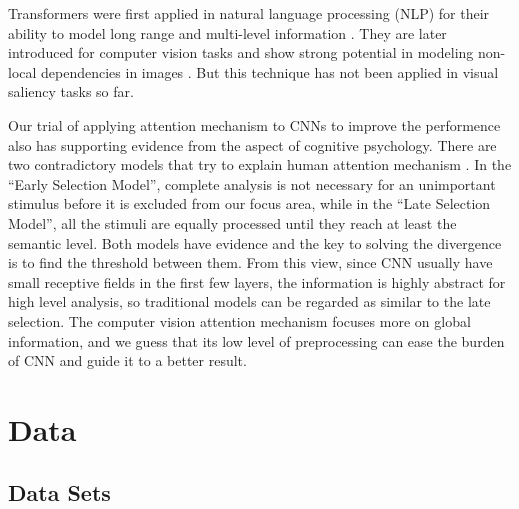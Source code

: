 \documentclass[12pt]{article}
\begin{document}
Transformers were first applied in natural language processing (NLP) for their ability to model long range and multi-level information \cite{bahdanauNeuralMachineTranslation2016a, vaswaniAttentionAllYou2017a}.
They are later introduced for computer vision tasks and show strong potential in modeling non-local dependencies in images \cite{zhangSelfAttentionGenerativeAdversarial2019a}.
But this technique has not been applied in visual saliency tasks so far.

Our trial of applying attention mechanism to CNNs to improve the performence also has supporting evidence from the aspect of cognitive psychology. There are two contradictory models that try to explain human attention mechanism \cite{gazzaniga2006cognitive}. 
In the “Early Selection Model”, complete analysis is not necessary for an unimportant stimulus before it is excluded from our focus area, while in the “Late Selection Model”, all the stimuli are equally processed until they reach at least the semantic level. 
Both models have evidence and the key to solving the divergence is to find the threshold between them. From this view, since CNN usually have small receptive fields in the first few layers, the information is highly abstract for high level analysis, so traditional models can be regarded as similar to the late selection. 
The computer vision attention mechanism focuses more on global information, and we guess that its low level of preprocessing can ease the burden of CNN and guide it to a better result.

\section{Data}
\subsection{Data Sets}
\end{document}
